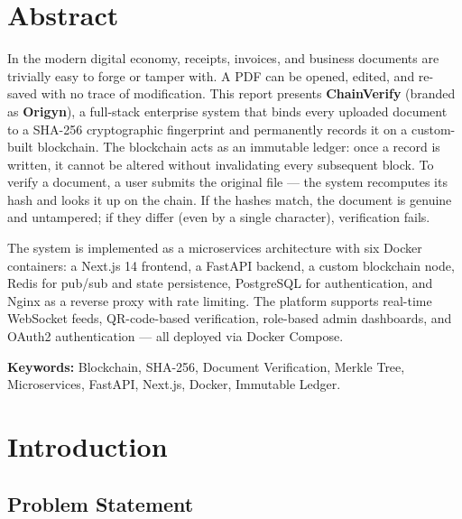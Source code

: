 \documentclass[12pt, a4paper]{report}
\begin{document}

\chapter*{Abstract}

In the modern digital economy, receipts, invoices, and business documents are
trivially easy to forge or tamper with. A PDF can be opened, edited, and
re-saved with no trace of modification. This report presents
\textbf{ChainVerify} (branded as \textbf{Origyn}), a full-stack enterprise
system that binds every uploaded document to a SHA-256 cryptographic fingerprint
and permanently records it on a custom-built blockchain. The blockchain acts as
an immutable ledger: once a record is written, it cannot be altered without
invalidating every subsequent block. To verify a document, a user submits the
original file — the system recomputes its hash and looks it up on the chain. If
the hashes match, the document is genuine and untampered; if they differ (even
by a single character), verification fails.

The system is implemented as a microservices architecture with six Docker
containers: a Next.js 14 frontend, a FastAPI backend, a custom blockchain node,
Redis for pub/sub and state persistence, PostgreSQL for authentication, and
Nginx as a reverse proxy with rate limiting. The platform supports real-time
WebSocket feeds, QR-code-based verification, role-based admin dashboards, and
OAuth2 authentication — all deployed via Docker Compose.

\textbf{Keywords:} Blockchain, SHA-256, Document Verification, Merkle Tree,
Microservices, FastAPI, Next.js, Docker, Immutable Ledger.

\tableofcontents

\chapter{Introduction}

\section{Problem Statement}
\end{document}
